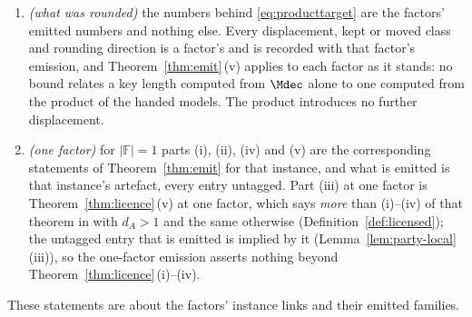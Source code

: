 \begin{theorem}
\begin{enumerate}[label=(\roman*),leftmargin=3.0em]
  numbers lies in general on a finer lattice only and need not be a binary64
  number, exactly as for the blocks of \eqref{eq:producttarget}.
\item \emph{(what was rounded)} the numbers behind \eqref{eq:producttarget}
  are the factors' emitted numbers and nothing else. Every displacement,
  kept or moved class and rounding direction is a factor's and is
  recorded with that factor's emission,
  and Theorem~\ref{thm:emit}\,(v) applies to each factor as it stands: no
  bound relates a key length computed from $\Mdec$ alone to one computed
  from the product of the handed models. The product introduces no further
  displacement.
\item \emph{(one factor)} for $|\mathbb{F}|=1$ parts (i), (ii), (iv) and (v)
  are the corresponding statements of Theorem~\ref{thm:emit} for that
  instance, and what is emitted is that instance's artefact, every entry
  untagged. Part (iii) at one factor is Theorem~\ref{thm:licence}\,(v) at one
  factor, which says \emph{more} than (i)--(iv) of that theorem in
   with $d_A>1$ and the same otherwise
  (Definition~\ref{def:licensed}); the untagged entry that is emitted is
  implied by it (Lemma~\ref{lem:party-local}\,(iii)), so the one-factor
  emission asserts nothing beyond Theorem~\ref{thm:licence}\,(i)--(iv).
\end{enumerate}
These statements are about the factors' instance links and their emitted
families.
\end{theorem}

